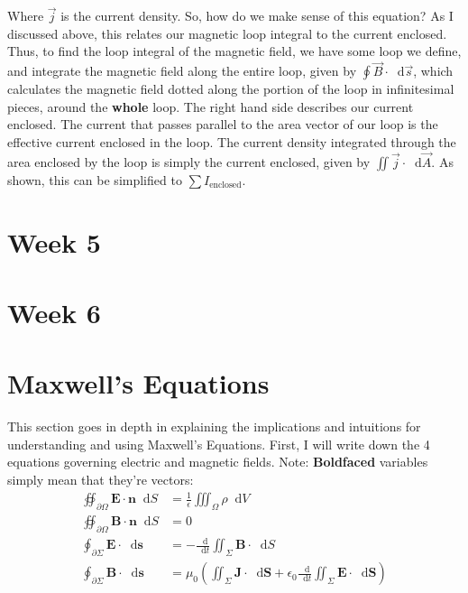 \documentclass{article}
\newcommand*\VF[1]{\mathbf{#1}}
\newcommand*\dif{\mathop{}\!\mathrm{d}}
\begin{document}
Where $\vec{j}$ is the current density. So, how do we make sense of this equation? As I discussed above, this relates our magnetic loop integral to the current enclosed. Thus, to find the loop integral of the magnetic field, we have some loop we define, and integrate the magnetic field along the entire loop, given by $\oint \vec{B} \cdot \dif \vec{s}$, which calculates the magnetic field dotted along the portion of the loop in infinitesimal pieces, around the \textbf{whole} loop. The right hand side describes our current enclosed. The current that passes parallel to the area vector of our loop is the effective current enclosed in the loop. The current density integrated through the area enclosed by the loop is simply the current enclosed, given by $\iint \vec{j} \cdot \dif \vec{A}$. As shown, this can be simplified to $\sum\limits I_{\text{enclosed}}$. 

\pagebreak

\section{Week 5}

\pagebreak

\section{Week 6}

\pagebreak

\section{Maxwell's Equations}
This section goes in depth in explaining the implications and intuitions for understanding and using Maxwell's Equations. First, I will write down the 4 equations governing electric and magnetic fields. Note: \textbf{Boldfaced} variables simply mean that they're vectors:
\begin{align*}
    \oiint_{\partial \Omega} \VF{E} \cdot \VF{n} \dif S
    &= \frac{1}{\epsilon}\iiint_{\Omega} \rho \dif V\\
    \oiint_{\partial \Omega} \VF{B} \cdot \VF{n} \dif S
    &= 0\\
    \oint_{\partial \Sigma} \VF{E} \cdot \dif \VF{s}
    &= -\frac{\dif}{\dif t}\iint_\Sigma \VF{B} \cdot \dif S\\
    \oint_{\partial \Sigma} \VF{B} \cdot \dif \VF{s}
    &= \mu_0\left(\iint_\Sigma \VF{J} \cdot \dif \VF{S} + \epsilon_0\frac{\dif}{\dif t}\iint_\Sigma \VF{E} \cdot \dif \VF{S}\right)
\end{align*}\\
\end{document}
